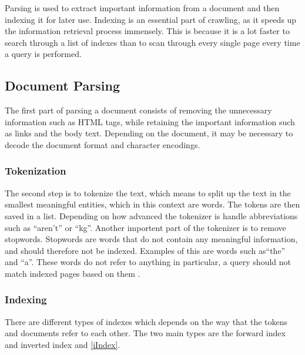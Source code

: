 Parsing is used to extract important information from a document and then
indexing it for later use. Indexing is an essential part of crawling, as it
speeds up the information retrieval process immensely. This is because it is a
lot faster to search through a list of indexes than to scan through every
single page every time a query is performed.

\subsection{Document Parsing}
The first part of parsing a document consists of removing the unnecessary
information such as HTML tags, while retaining the important information such
as links and the body text. Depending on the document, it may be necessary to
decode the document format and character encodings.

\subsubsection{Tokenization}
The second step is to tokenize the text, which means to split up the text in the
smallest meaningful entities, which in this context are words. The tokens are
then saved in a list. Depending on how advanced the tokenizer is  handle
abbreviations such as ``aren't'' or ``kg''. Another importent part of the
tokenizer is to remove stopwords. Stopwords are words that do not contain any
meaningful information, and should therefore not be indexed. Examples of this
are words such as``the'' and ``a''. These words do not refer to anything in
particular, a query should not match indexed pages based on them \citep[Ch.
2]{manning2008introduction}.

\subsubsection{Indexing}
There are different types of indexes which depends on the way that the
tokens and documents refer to each other. The two main types are the forward
index and inverted index and \autoref{iIndex}.

